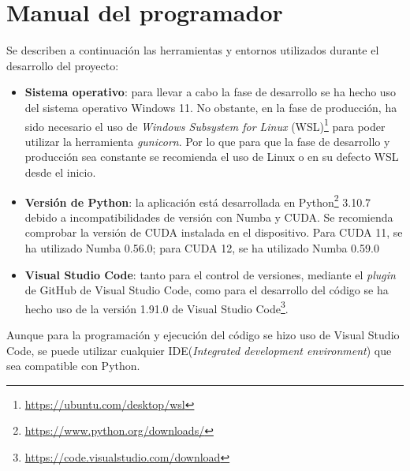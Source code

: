 
\newpage


\section{Manual del programador}

Se describen a continuación las herramientas y entornos utilizados durante el desarrollo del proyecto:

\begin{itemize}
\item \textbf{Sistema operativo}: para llevar a cabo la fase de desarrollo se ha hecho uso del sistema operativo Windows 11. No obstante, en la fase de producción, ha sido necesario el uso de \textit{Windows Subsystem for Linux} (WSL)\footnote{\url{https://ubuntu.com/desktop/wsl}} para poder utilizar la herramienta \textit{gunicorn}. Por lo que para que la fase de desarrollo y producción sea constante se recomienda el uso de Linux o en su defecto WSL desde el inicio.
\item \textbf{Versión de Python}: la aplicación está desarrollada en Python\footnote{\url{https://www.python.org/downloads/}} 3.10.7 debido a incompatibilidades de versión con Numba y CUDA. Se recomienda comprobar la versión de CUDA instalada en el dispositivo. Para CUDA 11, se ha utilizado Numba 0.56.0; para CUDA 12, se ha utilizado Numba 0.59.0
\item \textbf{Visual Studio Code}: tanto para el control de versiones, mediante el \textit{plugin} de GitHub de Visual Studio Code, como para el desarrollo del código se ha hecho uso de la versión 1.91.0 de Visual Studio Code\footnote{\url{https://code.visualstudio.com/download}}. 
\end{itemize}

Aunque para la programación y ejecución del código se hizo uso de Visual Studio Code, se puede utilizar cualquier IDE(\textit{Integrated development environment}) que sea compatible con Python.

